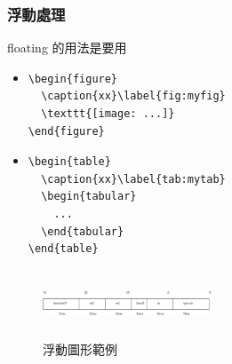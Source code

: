 \subsubsection{浮動處理}
floating 的用法是要用
\begin{itemize}
\item \begin{verbatim}
\begin{figure}
  \caption{xx}\label{fig:myfig}
  \texttt{[image: ...]}
\end{figure}
\end{verbatim}
\item \begin{verbatim}
\begin{table}
  \caption{xx}\label{tab:mytab}
  \begin{tabular}
    ...
  \end{tabular}
\end{table}
\end{verbatim}
\end{itemize}
\begin{figure}
\caption{浮動圖形範例}
\centering
\includegraphics[width=5cm,height=2cm]{images/riscv.eps}
\end{figure}

